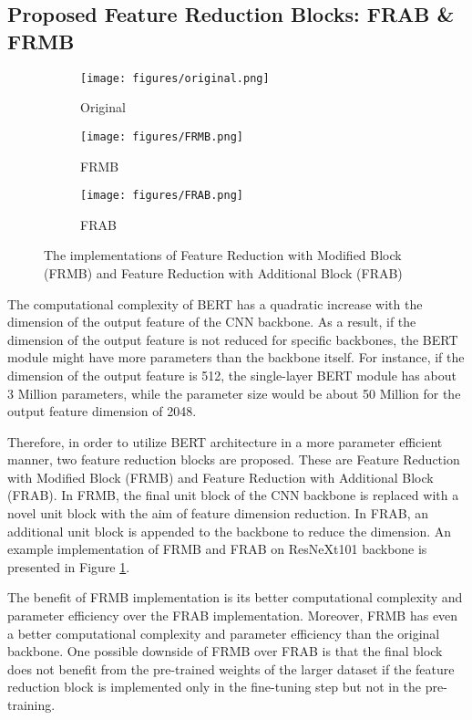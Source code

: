 \documentclass[runningheads]{llncs}
\begin{document}
\subsection{Proposed Feature Reduction Blocks: FRAB \& FRMB}
\label{sec:proposed_method_FR}

\begin{figure}[t]
	\centering
	\begin{subfigure}[b]{0.3\textwidth}{
    	\texttt{[image: figures/original.png]}}
    \caption{Original}
	\end{subfigure}
	\begin{subfigure}[b]{0.3\textwidth}{
    	\texttt{[image: figures/FRMB.png]}}
    \caption{FRMB}
	\end{subfigure}
	\begin{subfigure}[b]{0.3\textwidth}{
    	\texttt{[image: figures/FRAB.png]}}
    \caption{FRAB}
	\end{subfigure}
	\caption{The implementations of Feature Reduction with Modified Block (FRMB) and Feature Reduction with Additional Block (FRAB)}
	\label{fig:feature_reduction}
\end{figure}

The computational complexity of BERT has a quadratic increase with the dimension of the output feature of the CNN backbone. As a result, if the dimension of the output feature is not reduced for specific backbones, the BERT module might have more parameters than the backbone itself. For instance, if the dimension of the output feature is 512, the single-layer BERT module has about 3 Million parameters, while the parameter size would be about 50 Million for the output feature dimension of 2048.

Therefore, in order to utilize BERT architecture in a more parameter efficient manner, two feature reduction blocks are proposed. These are Feature Reduction with Modified Block (FRMB) and Feature Reduction with Additional Block (FRAB). In FRMB, the final unit block of the CNN backbone is replaced with a novel unit block with the aim of feature dimension reduction. In FRAB, an additional unit block is appended to the backbone to reduce the dimension. An example implementation of FRMB and FRAB on ResNeXt101 backbone is presented in Figure \ref{fig:feature_reduction}.

The benefit of FRMB implementation is its better computational complexity and parameter efficiency over the FRAB implementation. Moreover, FRMB has even a better computational complexity and parameter efficiency than the original backbone. One possible downside of FRMB over FRAB is that the final block does not benefit from the pre-trained weights of the larger dataset if the feature reduction block is implemented only in the fine-tuning step but not in the pre-training. 
\end{document}
